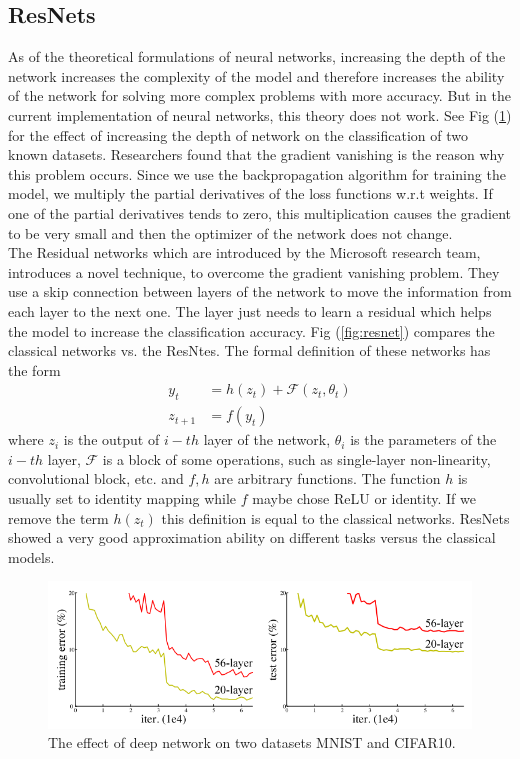 \documentclass{article}
\newcommand\pef[1]{(\ref{#1})}
\begin{document}
	\subsection{ResNets}
	As of the theoretical formulations of neural networks, increasing the depth of the network increases the complexity of the model and therefore increases the ability of the network for solving more complex problems with more accuracy. But in the current implementation of neural networks, this theory does not work. See Fig \pef{fig:deep} for the effect of increasing the depth of network on the classification of two known datasets. Researchers found that the gradient vanishing is the reason why this problem occurs. Since we use the backpropagation algorithm for training the model, we multiply the partial derivatives of the loss functions w.r.t weights. If one of the partial derivatives tends to zero, this multiplication causes the gradient to be very small and then the optimizer of the network does not change. 
	\\
		
	The Residual networks \cite{he2016deep} which are introduced by the Microsoft research team, introduces a novel technique, to overcome the gradient vanishing problem. They use a skip connection between layers of the network to move the information from each layer to the next one. The layer just needs to learn a residual which helps the model to increase the classification accuracy. Fig \pef{fig:resnet} compares the classical networks vs. the ResNtes. The formal definition of these networks has the form
	\begin{equation}
	\begin{aligned}
	y_t &= h(z_t) + \mathcal{F}(z_t,\theta_t)\\
	z_{t+1} &= f(y_t)
	\label{eq:resnet}
	\end{aligned}
	\end{equation}
	where $z_i$ is the output of $i-th$ layer of the network, $\theta_i$ is the parameters of the $i-th$ layer, $\mathcal{F}$ is a block of some operations, such as single-layer non-linearity, convolutional block, etc. and $f,h$ are arbitrary functions. The function $h$ is usually set to identity mapping while $f$ maybe chose ReLU or identity. If we remove the term $h(z_t)$ this definition is equal to the classical networks. ResNets showed a very good approximation ability on different tasks versus the classical models.
	
	
	\begin{figure}
		\centering		
		\includegraphics[width=1\linewidth]{images/deep}
		\caption{The effect of deep network on two datasets MNIST and CIFAR10.}
		\label{fig:deep}
		
	\end{figure}
	
\end{document}
